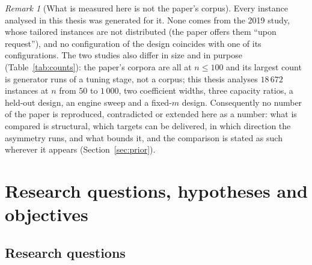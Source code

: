 \documentclass[a4paper,11pt]{article}
\theoremstyle{plain}
\theoremstyle{definition}
\theoremstyle{remark}
\newtheorem{remark}{Remark}
\begin{document}
\begin{remark}[What is measured here is not the paper's corpus]\label{rem:notpapercorpus}
Every instance analysed in this thesis was generated for it. None comes from the 2019 study,
whose tailored instances are not distributed (the paper offers them ``upon request''), and no
configuration of the design coincides with one of its configurations. The two studies also
differ in size and in purpose (Table~\ref{tab:counts}): the paper's corpora are all at
$n\le100$ and its largest count is generator runs of a tuning stage, not a corpus; this
thesis analyses $18\,672$ instances at $n$ from $50$ to $1\,000$, two coefficient widths,
three capacity ratios, a held-out design, an engine sweep and a fixed-$m$ design.
Consequently no number of the paper is
reproduced, contradicted or extended here as a number: what is compared is structural, which
targets can be delivered, in which direction the asymmetry runs, and what bounds it, and the
comparison is stated as such wherever it appears (Section~\ref{sec:prior}).
\end{remark}

\section{Research questions, hypotheses and objectives}

\subsection{Research questions}
\end{document}
